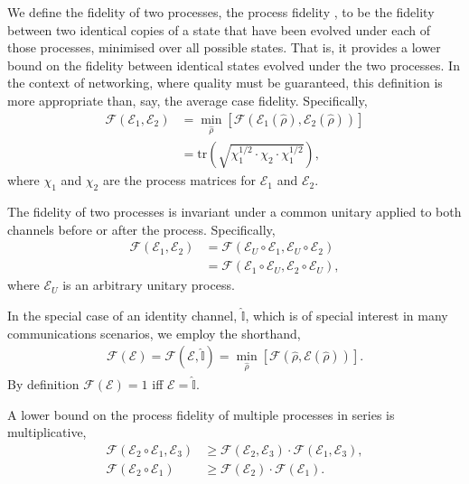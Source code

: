 \documentclass[aps, rmp, twocolumn, amsmath, amssymb, nofootinbib, superscriptaddress, longbibliography, floatfix, table-of-contents, eqsecnum]{revtex4-1}
\newcommand{\comment}[1]{{\color{blue}{\textbf{#1}}}}
\begin{document}
We define the fidelity of two processes, the process fidelity  \cite{bib:Gilchrist05}, to be the fidelity between two identical copies of a state that have been evolved under each of those processes, minimised over all possible states. That is, it provides a lower bound on the fidelity between identical states evolved under the two processes. In the context of networking, where quality must be guaranteed, this definition is more appropriate than, say, the average case fidelity. Specifically,
\begin{align}
\mathcal{F}(\mathcal{E}_1,\mathcal{E}_2) &= \min_{\hat\rho} \left[\mathcal{F}(\mathcal{E}_1(\hat\rho),\mathcal{E}_2(\hat\rho))\right] \nonumber \\
&= \text{tr}\left(\sqrt{\chi_1^{1/2}\cdot\chi_2\cdot\chi_1^{1/2}}\right),
\end{align}
\comment{CHECK THIS!} where $\chi_1$ and $\chi_2$ are the process matrices for $\mathcal{E}_1$ and $\mathcal{E}_2$.

The fidelity of two processes is invariant under a common unitary applied to both channels before or after the process. Specifically,
\begin{align}
\mathcal{F}(\mathcal{E}_1,\mathcal{E}_2) &= \mathcal{F}(\mathcal{E}_U\circ\mathcal{E}_1,\mathcal{E}_U\circ\mathcal{E}_2) \nonumber \\
&= \mathcal{F}(\mathcal{E}_1\circ \mathcal{E}_U,\mathcal{E}_2\circ \mathcal{E}_U),
\end{align}
where $\mathcal{E}_U$ is an arbitrary unitary process.

In the special case of an identity channel, $\hat{\mathbb{I}}$, which is of special interest in many communications scenarios, we employ the shorthand,
\begin{align}
\mathcal{F}(\mathcal{E}) = \mathcal{F}(\mathcal{E},\hat{\mathbb{I}}) = \min_{\hat\rho} \left[\mathcal{F}(\hat\rho,\mathcal{E}(\hat\rho))\right].
\end{align}
By definition \mbox{$\mathcal{F}(\mathcal{E})=1$} iff \mbox{$\mathcal{E}=\hat{\mathbb{I}}$}.

A lower bound on the process fidelity of multiple processes in series is multiplicative,
\begin{align}
\mathcal{F}(\mathcal{E}_2\circ\mathcal{E}_1,\mathcal{E}_3) &\geq \mathcal{F}(\mathcal{E}_2,\mathcal{E}_3)\cdot\mathcal{F}(\mathcal{E}_1,\mathcal{E}_3), \nonumber \\
\mathcal{F}(\mathcal{E}_2\circ\mathcal{E}_1) &\geq \mathcal{F}(\mathcal{E}_2)\cdot\mathcal{F}(\mathcal{E}_1).
\end{align}
\end{document}
